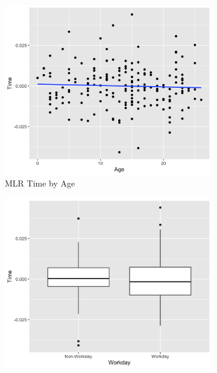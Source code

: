 \documentclass[12pt,twoside,leqno,fleqn,letterpaper]{article}
\theoremstyle{definition}
\theoremstyle{definition}
\begin{document}
    \begin{figure} 
        \centering
        \begin{subfigure}[b]{0.32\textwidth}
        \centering
        \includegraphics[width=\textwidth]{pics/mlr time by age.png}
        \caption[]%
        {{\small MLR Time by Age}}
        \label{fig: time v age}
        \end{subfigure}
        \hfill
        \begin{subfigure}[b]{0.32\textwidth}
        \centering
        \includegraphics[width=\textwidth]{pics/mlr time by day.png}

\end{subfigure}
\end{figure}
\end{document}
